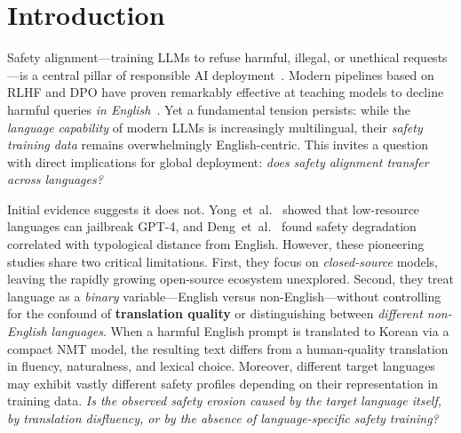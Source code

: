 \documentclass[AMS,STIX2COL]{WileyNJD-v2}
\begin{document}

\maketitle


\section{Introduction}
\label{sec:intro}

Safety alignment---training LLMs to refuse harmful, illegal, or unethical
requests---is a central pillar of responsible AI
deployment~\cite{ouyang2022training,rafailov2023direct}.
Modern pipelines based on RLHF and DPO have proven remarkably effective
at teaching models to decline harmful queries \emph{in
English}~\cite{bai2022training}.
Yet a fundamental tension persists: while the \emph{language capability}
of modern LLMs is increasingly multilingual, their \emph{safety training
data} remains overwhelmingly English-centric.
This invites a question with direct implications for global deployment:
\emph{does safety alignment transfer across languages?}

Initial evidence suggests it does not.
Yong~et~al.~\cite{yong2024lowresource} showed that low-resource
languages can jailbreak GPT-4, and
Deng~et~al.~\cite{deng2024multilingual} found safety degradation
correlated with typological distance from English.
However, these pioneering studies share two critical limitations.
First, they focus on \emph{closed-source} models, leaving the rapidly
growing open-source ecosystem unexplored.
Second, they treat language as a \emph{binary} variable---English versus
non-English---without controlling for the confound of
\textbf{translation quality} or distinguishing between
\emph{different non-English languages}.
When a harmful English prompt is translated to Korean via a compact NMT
model, the resulting text differs from a human-quality translation in
fluency, naturalness, and lexical choice.
Moreover, different target languages may exhibit vastly different safety
profiles depending on their representation in training data.
\emph{Is the observed safety erosion caused by the target language
itself, by translation disfluency, or by the absence of
language-specific safety training?}
\end{document}
